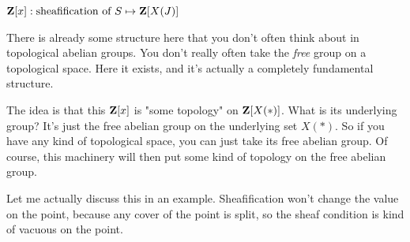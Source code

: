$ \mathbf Z[x]: \text{sheafification of } S \mapsto \mathbf Z[X(J)]$

There is already some structure here that you don't often think about in topological abelian groups. You don't really often take the \emph{free} group on a topological space. Here it exists, and it's actually a completely fundamental structure.

\begin{idea}
The idea is that this $\mathbf Z[x]$ is "some topology" on $\mathbf Z[X(\ast)]$. What is its underlying group? It's just the free abelian group on the underlying set $X(\ast)$. So if you have any kind of topological space, you can just take its free abelian group. Of course, this machinery will then put some kind of topology on the free abelian group.
\end{idea}

Let me actually discuss this in an example. 
Sheafification won't change the value on the point, because any cover of the point is split, so the sheaf condition is kind of vacuous on the point.


